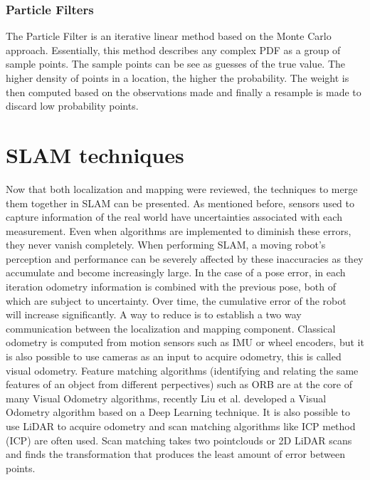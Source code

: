 \subsubsection{Particle Filters}

The Particle Filter is an iterative linear method based on the Monte Carlo approach. Essentially, this method describes any complex \acs*{PDF} as a group of sample points. The sample points can be see as guesses of the true value. The higher density of points in a location, the higher the probability. The weight is then computed based on the observations made and finally a resample is made to discard low probability points.

\section{\acs*{SLAM} techniques}

Now that both localization and mapping were reviewed, the techniques to merge them together in \acs*{SLAM} can be presented. As mentioned before, sensors used to capture information of the real world have uncertainties associated with each measurement. Even when algorithms are implemented to diminish these errors, they never vanish completely. When performing \acs*{SLAM}, a moving robot's perception and performance can be severely affected by these inaccuracies as they accumulate and become increasingly large. In the case of a pose error, in each iteration odometry information is combined with the previous pose, both of which are subject to uncertainty. Over time, the cumulative error of the robot will increase significantly. A way to reduce is to establish a two way communication between the localization and mapping component. Classical odometry is computed from motion sensors such as \acs*{IMU} or wheel encoders, but it is also possible to use cameras as an input to acquire odometry, this is called visual odometry. Feature matching algorithms (identifying and relating the same features of an object from different perpectives) such as ORB \cite{rublee_orb_2011} are at the core of many Visual Odometry algorithms, recently Liu et al. \cite{liu_visual_2021} developed a Visual Odometry algorithm based on a Deep Learning technique.
It is also possible to use \acs*{LiDAR} to acquire odometry and scan matching algorithms like \acl*{ICP} method (\acs*{ICP}) are often used. Scan matching takes two pointclouds or 2D \acs*{LiDAR} scans and finds the transformation that produces the least amount of error between points.

